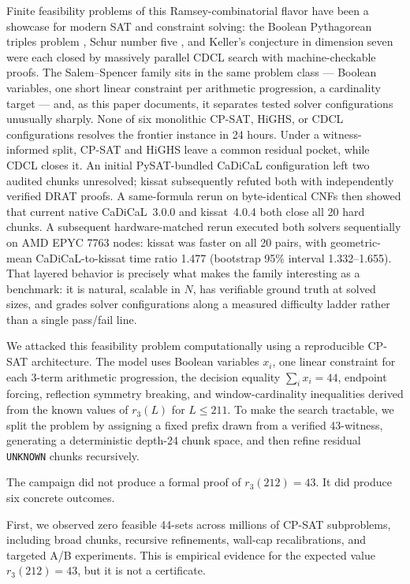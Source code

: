 Finite feasibility problems of this Ramsey-combinatorial flavor have been a
showcase for modern SAT and constraint solving: the Boolean Pythagorean
triples problem \cite{heule-kullmann-marek-2016}, Schur number five
\cite{heule-2018-schur}, and Keller's conjecture in dimension seven
\cite{brakensiek-heule-2020-keller} were each closed by massively parallel
CDCL search with machine-checkable proofs. The Salem--Spencer family sits in
the same problem class --- Boolean variables, one short linear constraint per
arithmetic progression, a cardinality target --- and, as this paper
documents, it separates tested solver configurations unusually sharply.
None of six monolithic CP-SAT, HiGHS, or CDCL configurations resolves the
frontier instance in 24 hours. Under a witness-informed split, CP-SAT and
HiGHS leave a common residual pocket, while CDCL closes it. An initial
PySAT-bundled CaDiCaL configuration left two audited chunks unresolved;
kissat subsequently refuted both with independently verified DRAT proofs.
A same-formula rerun on byte-identical CNFs then showed that current native
CaDiCaL~3.0.0 and kissat~4.0.4 both close all 20 hard chunks. A subsequent
hardware-matched rerun executed both solvers sequentially on AMD EPYC 7763
nodes: kissat was faster on all 20 pairs, with geometric-mean
CaDiCaL-to-kissat time ratio 1.477 (bootstrap 95\% interval 1.332--1.655).
That layered behavior is
precisely what makes the family interesting as a benchmark: it is natural,
scalable in $N$, has verifiable ground truth at solved sizes, and grades
solver configurations along a measured difficulty ladder rather than a
single pass/fail line.

We attacked this feasibility problem computationally using a reproducible
CP-SAT architecture. The model uses Boolean variables $x_i$, one linear
constraint for each 3-term arithmetic progression, the decision equality
$\sum_i x_i = 44$, endpoint forcing, reflection symmetry breaking, and
window-cardinality inequalities derived from the known values of $r_3(L)$ for
$L \leq 211$. To make the search tractable, we split the problem by assigning
a fixed prefix drawn from a verified 43-witness, generating a deterministic
depth-24 chunk space, and then refine residual \texttt{UNKNOWN} chunks recursively.

The campaign did not produce a formal proof of $r_3(212) = 43$. It did produce
six concrete outcomes.

First, we observed zero feasible 44-sets across millions of CP-SAT
subproblems, including broad chunks, recursive refinements, wall-cap
recalibrations, and targeted A/B experiments. This is empirical evidence for
the expected value $r_3(212) = 43$, but it is not a certificate.

